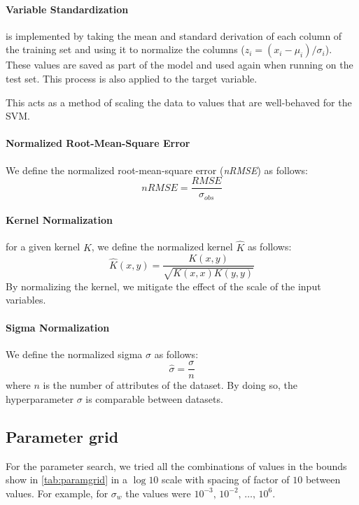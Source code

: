 \paragraph{Variable Standardization} is implemented by taking the mean and
standard derivation of each column of the training set and using it to normalize
the columns ($z_i = (x_i - \mu_i)/\sigma_i$). These values are saved as part of
the model and used again when running on the test set. This process is also
applied to the target variable.

This acts as a method of scaling the data to values that are well-behaved for
the SVM.

\paragraph{Normalized Root-Mean-Square Error} We define the
normalized root-mean-square error (\emph{nRMSE}) as follows:
\begin{equation}
    nRMSE = \frac{RMSE}{\sigma_{obs}}
\end{equation}

\paragraph{Kernel Normalization} for a given kernel $K$, we define the
normalized kernel $\hat{K}$ as follows:
\begin{equation}
    \hat{K}(x, y) = \frac{K(x, y)}{\sqrt{K(x, x)K(y, y)}}
\end{equation}
By normalizing the kernel, we mitigate the effect of the scale of the
input variables. %

\paragraph{Sigma Normalization} We define the normalized sigma $\hat{\sigma}$
as follows:
\begin{equation}
    \hat{\sigma} = \frac{\sigma}{n}
\end{equation}
where $n$ is the number of attributes of the dataset. By doing so, the
hyperparameter $\sigma$ is comparable between datasets.

\subsection{Parameter grid}

For the parameter search, we tried all the combinations of values in the bounds
show in \cref{tab:paramgrid} in a $\log 10$ scale with spacing of factor of $10$
between values. For example, for $\sigma_w$ the values were
$10^{-3},\,10^{-2},\,\dots,\,10^{6}$.

